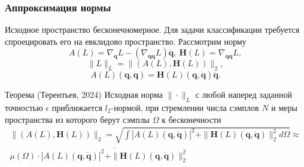\documentclass{beamer}
\begin{document}
\begin{frame}
\frametitle{Аппроксимация нормы}
Исходное пространство бесконечномерное. Для задачи классификации требуется спроецировать его на евклидово пространство. Рассмотрим норму
$$A(L) = \nabla_{\mathbf{q}} L-\left(\nabla_{\dot{\mathbf{q}}\mathbf{q}} L\right) \dot{\mathbf{q}},\ \mathbf{H}(L) = \nabla_{\dot{\mathbf{q}} \dot{\mathbf{q}}} L,$$
$$\|L\|_L = \|(A(L), \mathbf{H}(L))\|_2,$$
\begin{equation*}
A(L)(\mathbf{q}, \dot{\mathbf{q}}) = \mathbf{H}(L)(\mathbf{q}, \dot{\mathbf{q}})\ddot{\mathbf{q}}.
\end{equation*}

\begin{block} {Теорема (Терентьев, 2024)}
Исходная норма $\|\cdot\|_L$ с любой наперед заданной точностью $\epsilon$ приближается $l_2$-нормой, при стремлении числа сэмплов $N$ и меры пространства из которого берут сэмплы $\Omega$ к бесконечности
\[
\begin{split}
    \|(A(L),  \mathbf{H}(L))\|_2 = \sqrt{\int |A(L)\left(\mathbf{q}, \dot{\mathbf{q}}\right)|^2 + \|\mathbf{H}(L)\left(\mathbf{q}, \dot{\mathbf{q}}\right)\|_2^2  d\Omega} \approx
\\
\mu(\Omega) \cdot \overline{|A(L)\left(\mathbf{q}, \dot{\mathbf{q}}\right)|^2 + \|\mathbf{H}(L)\left(\mathbf{q}, \dot{\mathbf{q}}\right)\|_2^2}
\end{split}
\]
\end{block} 
\end{frame}
\end{document}
